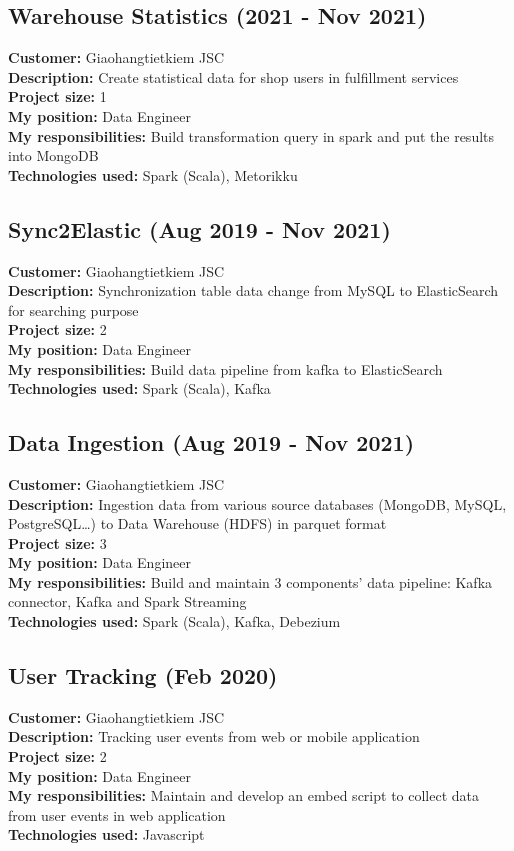 \documentclass[11pt,a4paper,roman]{moderncv}
\begin{document}
    \subsection{Warehouse Statistics (2021 - Nov 2021)}
    \textbf{Customer:} Giaohangtietkiem JSC \\
    \textbf{Description:} Create statistical data for shop users in fulfillment services \\
    \textbf{Project size:} 1 \\
    \textbf{My position:} Data Engineer \\
    \textbf{My responsibilities:} Build transformation query in spark and put the results into MongoDB \\
    \textbf{Technologies used:} Spark (Scala), Metorikku

    \subsection{Sync2Elastic (Aug 2019 - Nov 2021)}
    \textbf{Customer:} Giaohangtietkiem JSC \\
    \textbf{Description:} Synchronization table data change from MySQL to ElasticSearch for searching purpose \\
    \textbf{Project size:} 2 \\
    \textbf{My position:} Data Engineer \\
    \textbf{My responsibilities:} Build data pipeline from kafka to ElasticSearch \\
    \textbf{Technologies used:} Spark (Scala), Kafka

    \subsection{Data Ingestion (Aug 2019 - Nov 2021)}
    \textbf{Customer:} Giaohangtietkiem JSC \\
    \textbf{Description:} Ingestion data from various source databases (MongoDB, MySQL, PostgreSQL\ldots) to Data Warehouse (HDFS) in parquet format \\
    \textbf{Project size:} 3 \\
    \textbf{My position:} Data Engineer \\
    \textbf{My responsibilities:} Build and maintain 3 components' data pipeline: Kafka connector, Kafka and Spark Streaming \\
    \textbf{Technologies used:} Spark (Scala), Kafka, Debezium

    \subsection{User Tracking (Feb 2020)}
    \textbf{Customer:} Giaohangtietkiem JSC \\
    \textbf{Description:} Tracking user events from web or mobile application \\
    \textbf{Project size:} 2 \\
    \textbf{My position:} Data Engineer \\
    \textbf{My responsibilities:} Maintain and develop an embed script to collect data from user events in web application \\
    \textbf{Technologies used:} Javascript
\end{document}
